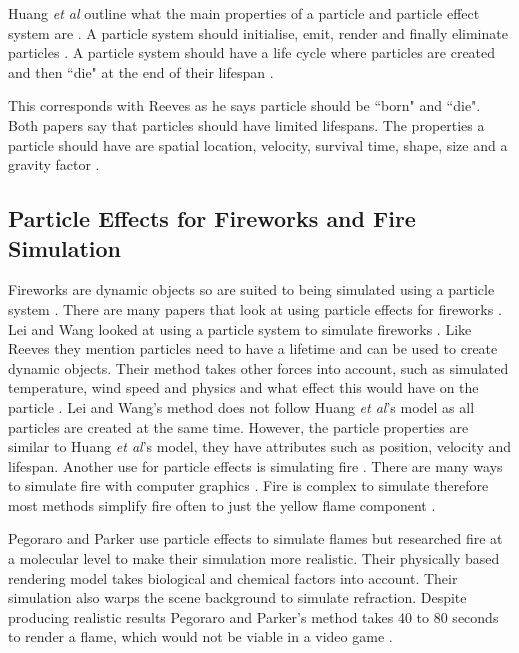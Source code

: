 \documentclass{scrartcl}
\begin{document}
Huang \textit{et al} outline what the main properties of a particle and particle effect system are \cite{Huang}.
A particle system should initialise, emit, render and finally eliminate particles \cite{Huang}.  A particle system should have a life cycle where particles are created and then ``die" at the end of their lifespan \cite{Reeves, Huang}. 

This corresponds with Reeves as he says particle should be ``born" and ``die". Both papers say that particles should have limited lifespans\cite{Reeves, Huang}.
The properties a particle should have are spatial location, velocity, survival  time, shape, size and a gravity factor \cite{Huang}.

\subsection{Particle Effects for Fireworks and Fire Simulation}
Fireworks are dynamic objects so are suited to being simulated using a particle system \cite{Lei, Reeves}. There are many papers that look at using particle effects for fireworks \cite{Lei, Dong, Zhang}.  Lei and Wang looked at using a particle system to simulate fireworks \cite{Lei}. Like Reeves they mention particles need to have a lifetime and can be used to create dynamic objects.
Their method takes other forces into account, such as simulated temperature, wind speed and physics and what effect this would have on the particle \cite{Lei}.  Lei and Wang's method does not follow Huang \textit{et al}'s model as all particles are created at the same time. 
However, the particle properties are similar to Huang \textit{et al}'s model, they have attributes such as position, velocity and lifespan.
\bigskip
Another use for particle effects is simulating fire \cite{Pegoraro}. There are many ways to simulate fire with computer graphics \cite{BridaultLouchez, Beaudoin, Lamorlette}.  Fire is complex to simulate therefore most methods simplify fire often to just the yellow flame component \cite{Pegoraro}. 

Pegoraro and Parker use particle effects to simulate flames but researched fire at a molecular level to make their simulation more realistic. Their physically based rendering model takes biological and chemical factors into account. Their simulation also warps the scene background to simulate refraction.  Despite producing realistic results Pegoraro and Parker's method takes 40 to 80 seconds to render a flame, which would not be viable in a video game \cite{Pegoraro}.
\end{document}
